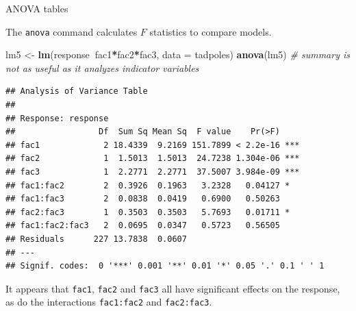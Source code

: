 \documentclass[
  ignorenonframetext,
]{beamer}
\newenvironment{Shaded}{\begin{snugshade}}{\end{snugshade}}
\newcommand{\CommentTok}[1]{\textcolor[rgb]{0.56,0.35,0.01}{\textit{#1}}}
\newcommand{\DataTypeTok}[1]{\textcolor[rgb]{0.13,0.29,0.53}{#1}}
\newcommand{\KeywordTok}[1]{\textcolor[rgb]{0.13,0.29,0.53}{\textbf{#1}}}
\newcommand{\NormalTok}[1]{#1}
\newcommand{\OperatorTok}[1]{\textcolor[rgb]{0.81,0.36,0.00}{\textbf{#1}}}
\newcommand{\StringTok}[1]{\textcolor[rgb]{0.31,0.60,0.02}{#1}}
\begin{document}
\begin{frame}[fragile]{ANOVA tables}
\protect\hypertarget{anova-tables}{}

The \texttt{anova} command calculates \(F\) statistics to compare
models.

\scriptsize

\begin{Shaded}
\begin{Highlighting}[]
\NormalTok{lm5 <-}\StringTok{ }\KeywordTok{lm}\NormalTok{(response}\OperatorTok{~}\NormalTok{fac1}\OperatorTok{*}\NormalTok{fac2}\OperatorTok{*}\NormalTok{fac3, }\DataTypeTok{data =}\NormalTok{ tadpoles)}
\KeywordTok{anova}\NormalTok{(lm5) }\CommentTok{# summary is not as useful as it analyzes indicator variables}
\end{Highlighting}
\end{Shaded}

\begin{verbatim}
## Analysis of Variance Table
## 
## Response: response
##                 Df  Sum Sq Mean Sq  F value    Pr(>F)    
## fac1             2 18.4339  9.2169 151.7899 < 2.2e-16 ***
## fac2             1  1.5013  1.5013  24.7238 1.304e-06 ***
## fac3             1  2.2771  2.2771  37.5007 3.984e-09 ***
## fac1:fac2        2  0.3926  0.1963   3.2328   0.04127 *  
## fac1:fac3        2  0.0838  0.0419   0.6900   0.50263    
## fac2:fac3        1  0.3503  0.3503   5.7693   0.01711 *  
## fac1:fac2:fac3   2  0.0695  0.0347   0.5723   0.56505    
## Residuals      227 13.7838  0.0607                       
## ---
## Signif. codes:  0 '***' 0.001 '**' 0.01 '*' 0.05 '.' 0.1 ' ' 1
\end{verbatim}

\normalsize

It appears that \texttt{fac1}, \texttt{fac2} and \texttt{fac3} all have
significant effects on the response, as do the interactions
\texttt{fac1:fac2} and \texttt{fac2:fac3}.

\end{frame}
\end{document}
